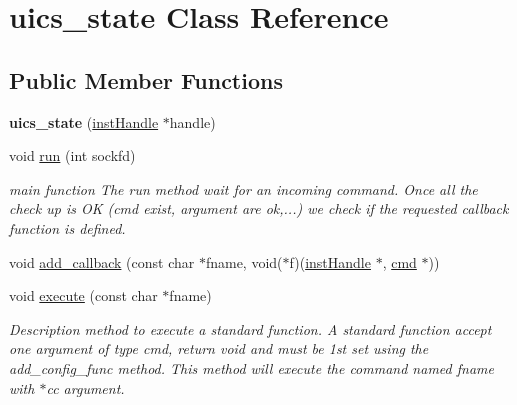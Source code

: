 \hypertarget{classuics__state}{}\section{uics\+\_\+state Class Reference}
\label{classuics__state}
\subsection*{Public Member Functions}
\begin{DoxyCompactItemize}
\item 
{\bfseries uics\+\_\+state} (\hyperlink{structinstHandle}{inst\+Handle} $\ast$handle)\hypertarget{classuics__state_a40c27abc73f074856b5ab15435937c80}{}\label{classuics__state_a40c27abc73f074856b5ab15435937c80}

\item 
void \hyperlink{classuics__state_aa0723e76e6901b77c1654c3d8ca76b14}{run} (int sockfd)\hypertarget{classuics__state_aa0723e76e6901b77c1654c3d8ca76b14}{}\label{classuics__state_aa0723e76e6901b77c1654c3d8ca76b14}

\begin{DoxyCompactList}\small\item\em main function The run method wait for an incoming command. Once all the check up is OK (cmd exist, argument are ok,...) we check if the requested callback function is defined. \end{DoxyCompactList}\item 
void \hyperlink{classuics__state_aa2c64860332d9831684e183ad1edd954}{add\+\_\+callback} (const char $\ast$fname, void($\ast$f)(\hyperlink{structinstHandle}{inst\+Handle} $\ast$, \hyperlink{structCMD__struct}{cmd} $\ast$))
\item 
void \hyperlink{classuics__state_a036564ebb10a103182a79d9a5b40b748}{execute} (const char $\ast$fname)\hypertarget{classuics__state_a036564ebb10a103182a79d9a5b40b748}{}\label{classuics__state_a036564ebb10a103182a79d9a5b40b748}

\begin{DoxyCompactList}\small\item\em Description method to execute a standard function. A standard function accept one argument of type cmd, return void and must be 1st set using the add\+\_\+config\+\_\+func method. This method will execute the command named fname with $\ast$cc argument. \end{DoxyCompactList}\end{DoxyCompactItemize}


